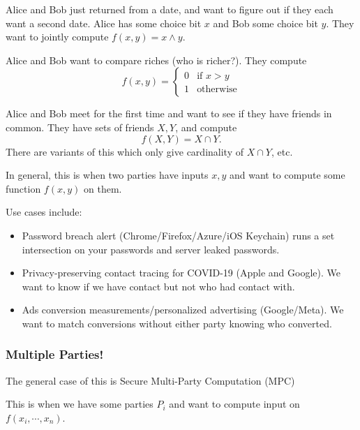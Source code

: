 \begin{example}
    Alice and Bob just returned from a date, and want to figure out if they each want a second date. Alice has some choice bit $x$ and Bob some choice bit $y$. They want to jointly compute $f(x, y) = x\land y$.
\end{example}
\begin{example}
    Alice and Bob want to compare riches (who is richer?). They compute
    \[f(x, y) = \begin{cases}
            0 & \text{if }x>y    \\
            1 & \text{otherwise}
        \end{cases}\]
\end{example}
\begin{example}
    Alice and Bob meet for the first time and want to see if they have friends in common. They have sets of friends $X,Y$, and compute
    \[f(X, Y) = X\cap Y.\]
    There are variants of this which only give cardinality of $X\cap Y$, etc.
\end{example}


In general, this is when two parties have inputs $x, y$ and want to compute some function $f(x, y)$ on them.

Use cases include:
\begin{itemize}
    \item Password breach alert (Chrome/Firefox/Azure/iOS Keychain) runs a set intersection on your passwords and server leaked passwords.
    \item Privacy-preserving contact tracing for COVID-19 (Apple and Google). We want to know if we have contact but not who had contact with.
    \item Ads conversion measurements/personalized advertising (Google/Meta). We want to match conversions without either party knowing who converted.
\end{itemize}

\subsubsection{Multiple Parties!}
The general case of this is Secure Multi-Party Computation (MPC)


This is when we have some parties $P_i$ and want to compute input on $f(x_i, \cdots, x_n)$.

